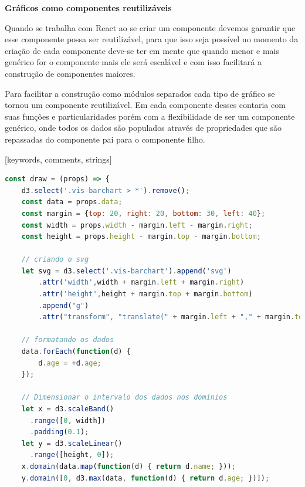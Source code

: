 {{\textbf{Gráficos como componentes reutilizáveis}

{Quando se trabalha com React \cite{REACT} ao se criar um componente devemos garantir que esse componente possa ser reutilizável, para que isso seja possível no momento da criação de cada componente deve-se ter em mente que quando menor e mais genérico for o componente mais ele será escalável e com isso facilitará a construção de componentes maiores.

Para facilitar a construção como módulos separados cada tipo de gráfico se tornou um componente reutilizável. Em cada componente desses contaria com suas funções e particularidades porém com a flexibilidade de ser um componente genérico, onde todos os dados são populados através de propriedades que são repassadas do componente pai para o componente filho. 

[keywords, comments, strings]

{\begin{lstlisting}[language=javascript,caption=exemplo de um componente de gráfico]
const draw = (props) => {
    d3.select('.vis-barchart > *').remove();
    const data = props.data;
    const margin = {top: 20, right: 20, bottom: 30, left: 40};
    const width = props.width - margin.left - margin.right;
    const height = props.height - margin.top - margin.bottom;
    
    // criando o svg
    let svg = d3.select('.vis-barchart').append('svg')
        .attr('width',width + margin.left + margin.right)
        .attr('height',height + margin.top + margin.bottom)
        .append("g")
        .attr("transform", "translate(" + margin.left + "," + margin.top + ")");

    // formatando os dados
    data.forEach(function(d) {
        d.age = +d.age;
    });

    // Dimensionar o intervalo dos dados nos domínios
    let x = d3.scaleBand()
      .range([0, width])
      .padding(0.1);
    let y = d3.scaleLinear()
      .range([height, 0]);
    x.domain(data.map(function(d) { return d.name; }));
    y.domain([0, d3.max(data, function(d) { return d.age; })]);


\end{lstlisting}}}}}
